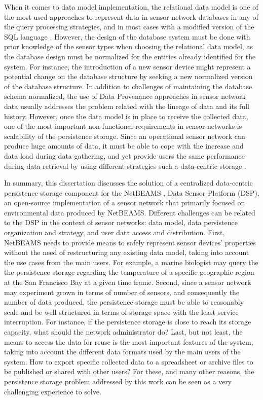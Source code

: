 When it comes to data model implementation, the relational data model
\cite{relational-model} is one of the most used approaches to represent data in
sensor network databases in any of the query processing strategies, and in most cases 
with a modified version of the SQL language \cite{sn-db-newop01}
\cite{sn-db-newop02}. However, the design of the database system must be done
with prior knowledge of the sensor types when  choosing the relational data
model, as the database design must be normalized \cite{db-normalization} for the entities
already identified for the system. For instance, the introduction of a new
sensor device might represent a potential change on the database structure by
seeking a new normalized version of the database structure. In addition to
challenges of maintaining the database schema normalized, the use of Data
Provenance approaches in sensor network data \cite{sn-provenance01} usually
addresses the problem related with the lineage of data  and its full history.
However, once the data model is in place to receive the collected data, one of
the most important non-functional requirements in sensor networks is
scalability of the persistence storage. Since an operational sensor network
can produce huge amounts of data, it must be able to cope with the increase
and data load during data gathering, and yet provide users the same
performance during data retrieval by using different strategies such a
data-centric storage \cite{sn-storage03}.

In summary, this dissertation discusses the solution of a centralized
data-centric persistence storage component for the NetBEAMS \cite{netbeams09},
Data Sensor Platform (DSP), an open-source \cite{open-source} implementation of
a sensor network that primarily focused on environmental data produced by NetBEAMS. 
Different challenges can be related to the DSP in the context of sensor 
networks: data model, data persistence organization and strategy, and user data
access and distribution. First, NetBEAMS needs to provide means to safely 
represent sensor devices' properties without the need of restructuring any 
existing data model, taking into account the use cases from the main users. 
For example, a marine biologist may query the the persistence storage regarding
the temperature of a specific geographic region at the San Francisco Bay at a 
given time frame. Second, since a sensor network may experiment grown in terms 
of number of sensors, and consequently the number of data produced, the
persistence  storage must be able to reasonably scale and be well structured
in terms of storage space with the least service interruption. For instance,
if the persistence storage is close to reach its storage capacity, what
should the network administrator do? Last, but not least, the means to access 
the data for reuse is the most important features of the system, taking into 
account the different data formats used by the main users of the system. How 
to export specific collected data to a spreadsheet or archive files to be 
published or shared with other users? For these, and many other reasons, the 
persistence storage problem addressed by this work can be seen as a very 
challenging experience to solve.

